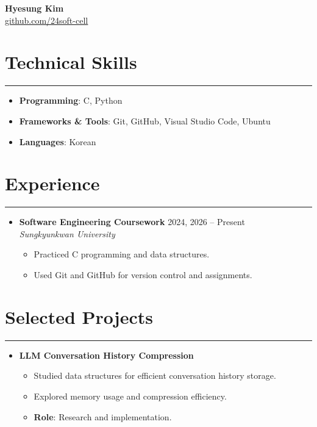 \documentclass[letterpaper,10pt]{article}
\begin{document}
\begin{center}
    \textbf{\LARGE Hyesung Kim} \\ \vspace{2pt}
    \href{https://github.com/24soft-cell}
    {\underline{github.com/24soft-cell}}
\end{center}

\section*{Technical Skills}
\hrule
\vspace{4pt}
\begin{itemize}
    \item[] \textbf{Programming}: C, Python
    \item[] \textbf{Frameworks \& Tools}: Git, GitHub, Visual Studio Code, Ubuntu
    \item[] \textbf{Languages}: Korean
\end{itemize}

\section*{Experience}
\hrule
\vspace{4pt}
\begin{itemize}
    \item[]
    \textbf{Software Engineering Coursework}
    \hfill 2024, 2026 -- Present \\
    \textit{Sungkyunkwan University}
    \begin{itemize}
        \item Practiced C programming and data structures.
        \item Used Git and GitHub for version control and assignments.
    \end{itemize}
\end{itemize}

\section*{Selected Projects}
\hrule
\vspace{4pt}
\begin{itemize}
    \item \textbf{LLM Conversation History Compression}
    \begin{itemize}
        \item Studied data structures for efficient conversation history storage.
        \item Explored memory usage and compression efficiency.
        \item \textbf{Role}: Research and implementation.
    \end{itemize}
\end{itemize}
\end{document}

